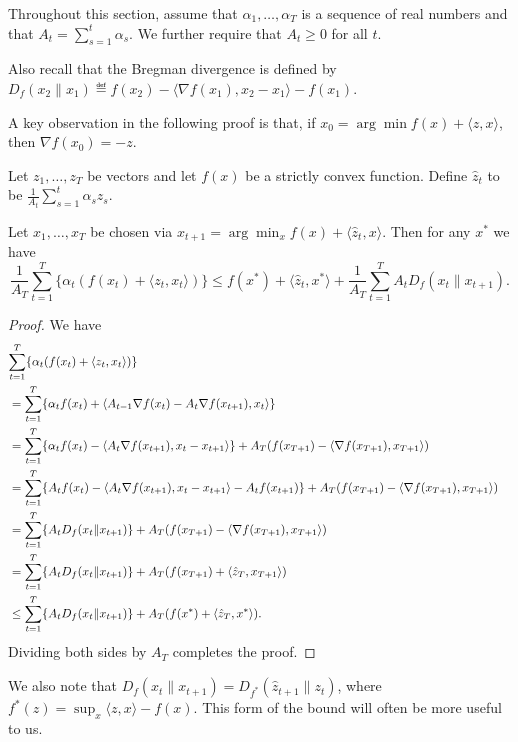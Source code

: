 \documentclass{article}
\begin{document}
 

Throughout this section, assume that $\alpha_1,\ldots,\alpha_T$ is 
a sequence of real numbers and that $A_t = \sum_{s=1}^t \alpha_s$. 
We further require that $A_t \geq 0$ for all $t$.

Also recall that the Bregman divergence is defined by $D_f(x_2 \| x_1) \eqdef f(x_2) - \langle \nabla f(x_1), x_2-x_1 \rangle - f(x_1)$.

A key observation in the following proof is that, if $x_0 = \arg\min f(x) + \langle z, x \rangle$, then $\nabla f(x_0) = -z$.


\begin{lemma}
\label{lem:ftl}
Let $z_1,\ldots,z_T$ be vectors and let $f(x)$ be a strictly convex 
function. Define $\hat{z}_t$ to be $\frac{1}{A_t} \sum_{s=1}^t \alpha_s z_s$.

Let $x_1,\ldots,x_T$ be chosen via $x_{t+1} = \arg\min_{x} f(x) + \langle \hat{z}_t, x\rangle$. 
Then for any $x^*$ we have
\begin{equation}
\frac{1}{A_T} \sum_{t=1}^T \{\alpha_t(f(x_t) + \langle z_t, x_t \rangle)\} \leq f(x^*) + \langle \hat{z}_t, x^* \rangle + \frac{1}{A_T} \sum_{t=1}^T A_t D_{f}(x_t \| x_{t+1}). 
\end{equation}
\end{lemma}
\begin{proof}
We have
\begin{align}
\lefteqn{\sum_{t=1}^T \{\alpha_t(f(x_t) + \langle z_t, x_t \rangle)\}} \\
 &= \sum_{t=1}^T \{\alpha_t f(x_t) + \langle A_{t-1} \nabla f(x_t) - A_t \nabla f(x_{t+1}), x_t \rangle\} \\
 &= \sum_{t=1}^T \{\alpha_t f(x_t) - \langle A_{t} \nabla f(x_{t+1}), x_t-x_{t+1} \rangle\} + A_T(f(x_{T+1})- \langle \nabla f(x_{T+1}), x_{T+1} \rangle) \\
 &= \sum_{t=1}^T \{A_t f(x_t) - \langle A_{t} \nabla f(x_{t+1}), x_t-x_{t+1} \rangle - A_t f(x_{t+1})\} + A_T(f(x_{T+1}) - \langle \nabla f(x_{T+1}), x_{T+1} \rangle) \\
 &= \sum_{t=1}^T \{A_tD_f(x_t \| x_{t+1})\} + A_T(f(x_{T+1}) - \langle \nabla f(x_{T+1}), x_{T+1} \rangle) \\
 &= \sum_{t=1}^T \{A_tD_f(x_t \| x_{t+1})\} + A_T(f(x_{T+1}) + \langle \hat{z}_T, x_{T+1} \rangle) \\
 &\leq \sum_{t=1}^T \{A_tD_f(x_t \| x_{t+1})\} + A_T(f(x^*) + \langle \hat{z}_T, x^* \rangle). \\
\end{align}
Dividing both sides by $A_T$ completes the proof.
\end{proof}
We also note that $D_f(x_t \| x_{t+1}) = D_{f^*}(\hat{z}_{t+1} \| z_t)$, where $f^*(z) = \sup_x \langle z,x\rangle - f(x)$. 
This form of the bound will often be more useful to us.
\end{document}
